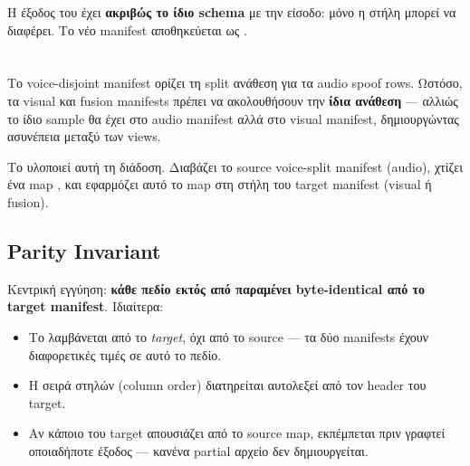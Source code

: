 Η έξοδος του 
έχει \textbf{ακριβώς το ίδιο schema} με την είσοδο:
μόνο η στήλη  μπορεί να διαφέρει.
Το νέο manifest αποθηκεύεται ως
.

\section{}
\label{sec:apply-voice-split}

Το voice-disjoint manifest ορίζει τη split ανάθεση
για τα audio spoof rows.
Ωστόσο, τα visual και fusion manifests πρέπει να ακολουθήσουν
την \textbf{ίδια ανάθεση} — αλλιώς το ίδιο sample
θα έχει  στο audio manifest
αλλά  στο visual manifest,
δημιουργώντας ασυνέπεια μεταξύ των views.

Το  υλοποιεί αυτή τη διάδοση.
Διαβάζει το source voice-split manifest (audio),
χτίζει ένα map ,
και εφαρμόζει αυτό το map στη στήλη 
του target manifest (visual ή fusion).

\subsection{Parity Invariant}
\label{subsec:parity-invariant}

Κεντρική εγγύηση: \textbf{κάθε πεδίο εκτός από 
παραμένει byte-identical από το target manifest}.
Ιδιαίτερα:

\begin{itemize}
  \item Το  λαμβάνεται από το \emph{target},
        όχι από το source — τα δύο manifests έχουν
        διαφορετικές τιμές σε αυτό το πεδίο.
  \item Η σειρά στηλών (column order) διατηρείται
        αυτολεξεί από τον header του target.
  \item Αν κάποιο  του target απουσιάζει
        από το source map, εκπέμπεται 
        πριν γραφτεί οποιαδήποτε έξοδος —
        κανένα partial αρχείο δεν δημιουργείται.
\end{itemize}


